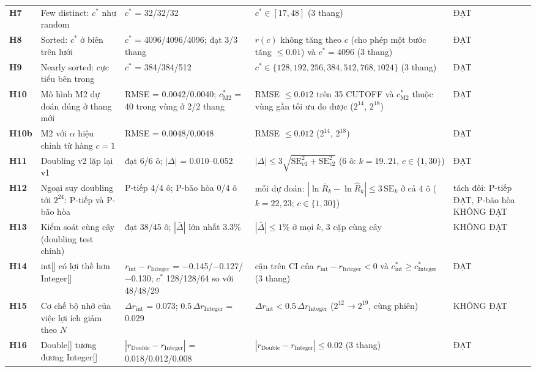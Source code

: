 \begin{longtable}{l>{\raggedright\arraybackslash}p{3.2cm}>{\raggedright\arraybackslash}p{4.2cm}>{\raggedright\arraybackslash}p{4.3cm}>{\raggedright\arraybackslash}p{1.8cm}}
\textbf{H7} & Few distinct: $c^*$ như random & $c^*$ = 32/32/32 & $c^*\in[17,48]$ (3 thang) & ĐẠT \\
\textbf{H8} & Sorted: $c^*$ ở biên trên lưới & $c^*$ = 4096/4096/4096; đạt 3/3 thang & $r(c)$ không tăng theo $c$ (cho phép một bước tăng $\le0.01$) và $c^*=4096$ (3 thang) & ĐẠT \\
\textbf{H9} & Nearly sorted: cực tiểu bên trong & $c^*$ = 384/384/512 & $c^*\in\{128,\allowbreak 192,\allowbreak 256,\allowbreak 384,\allowbreak 512,\allowbreak 768,\allowbreak 1024\}$ (3 thang) & ĐẠT \\
\textbf{H10} & Mô hình M2 dự đoán đúng ở thang mới & RMSE = 0.0042/0.0040; $c^*_{\mathrm{M2}}$ = 40 trong vùng ở 2/2 thang & RMSE $\le0.012$ trên 35 CUTOFF và $c^*_{\mathrm{M2}}$ thuộc vùng gần tối ưu đo được ($2^{14}$, $2^{18}$) & ĐẠT \\
\textbf{H10b} & M2 với $\alpha$ hiệu chỉnh từ hàng $c=1$ & RMSE = 0.0048/0.0048 & RMSE $\le0.012$ ($2^{14}$, $2^{18}$) & ĐẠT \\
\textbf{H11} & Doubling v2 lặp lại v1 & đạt 6/6 ô; $|\Delta|$ = 0.010–0.052 & $|\Delta|\le 3\sqrt{\mathrm{SE}_{v1}^2+\mathrm{SE}_{v2}^2}$ (6 ô: $k=19..21$, $c\in\{1,30\}$) & ĐẠT \\
\textbf{H12} & Ngoại suy doubling tới $2^{24}$: P-tiếp và P-bão hòa & P-tiếp 4/4 ô; P-bão hòa 0/4 ô & mỗi dự đoán: $|\ln\bar R_k-\ln\hat R_k|\le 3\,\mathrm{SE}_k$ ở cả 4 ô ($k=22,23$; $c\in\{1,30\}$) & tách đôi: P-tiếp ĐẠT, P-bão hòa KHÔNG ĐẠT \\
\textbf{H13} & Kiểm soát cùng cây (doubling test chính) & đạt 38/45 ô; $|\bar\Delta|$ lớn nhất 3.3\% & $|\bar\Delta|\le1\%$ ở mọi $k$, 3 cặp cùng cây & KHÔNG ĐẠT \\
\textbf{H14} & int[] có lợi thế hơn Integer[] & $r_{\mathrm{int}}-r_{\mathrm{Integer}}$ = $-$0.145/$-$0.127/$-$0.130; $c^*$ 128/128/64 so với 48/48/29 & cận trên CI của $r_{\mathrm{int}}-r_{\mathrm{Integer}}<0$ và $c^*_{\mathrm{int}}\ge c^*_{\mathrm{Integer}}$ (3 thang) & ĐẠT \\
\textbf{H15} & Cơ chế bộ nhớ của việc lợi ích giảm theo $N$ & $\Delta r_{\mathrm{int}}$ = 0.073; $0.5\,\Delta r_{\mathrm{Integer}}$ = 0.029 & $\Delta r_{\mathrm{int}}<0.5\,\Delta r_{\mathrm{Integer}}$ ($2^{12}\to2^{19}$, cùng phiên) & KHÔNG ĐẠT \\
\textbf{H16} & Double[] tương đương Integer[] & $|r_{\mathrm{Double}}-r_{\mathrm{Integer}}|$ = 0.018/0.012/0.008 & $|r_{\mathrm{Double}}-r_{\mathrm{Integer}}|\le0.02$ (3 thang) & ĐẠT \\

\end{longtable}
